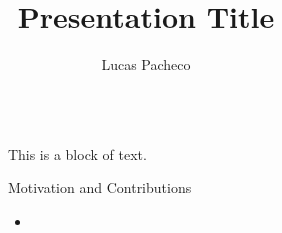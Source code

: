 \documentclass[final]{beamer}
\title{Presentation Title}
\author{Lucas Pacheco\inst{1}}
\institute[shortinst]{\inst{1} University of Bern}
\newlength{\sepwidth}
\newlength{\colwidth}
\newcommand{\separatorcolumn}{\begin{column}{\sepwidth}\end{column}}
\begin{document}
\begin{frame}[t]
\begin{columns}[t]
\separatorcolumn

\begin{column}{\colwidth}

\begin{block}{This is a block of text.}
\end{block}

\begin{block}{Motivation and Contributions}

\begin{itemize}
    \item 
\end{itemize}






\end{block}
\end{column}

\separatorcolumn
\end{columns}
\end{frame}
\end{document}
